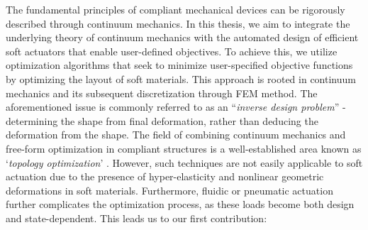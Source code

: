 The fundamental principles of compliant mechanical devices can be rigorously described through continuum mechanics. In this thesis, we aim to integrate the underlying theory of continuum mechanics with the automated design of efficient soft actuators that enable user-defined objectives. To achieve this, we utilize optimization algorithms that seek to minimize user-specified objective functions by optimizing the layout of soft materials. This approach is rooted in continuum mechanics \cite{Holzapfel2002,Kim2018} and its subsequent discretization through FEM method. The aforementioned issue is commonly referred to as an ``\emph{inverse design problem}'' - determining the shape from final deformation, rather than deducing the deformation from the shape. The field of combining continuum mechanics and free-form optimization in compliant structures is a well-established area known as `\emph{topology optimization}' \cite{Bendsoe2003}. However, such techniques are not easily applicable to soft actuation due to the presence of hyper-elasticity and nonlinear geometric deformations in soft materials. Furthermore, fluidic or pneumatic actuation further complicates the optimization process, as these loads become both design and state-dependent. This leads us to our first contribution:

